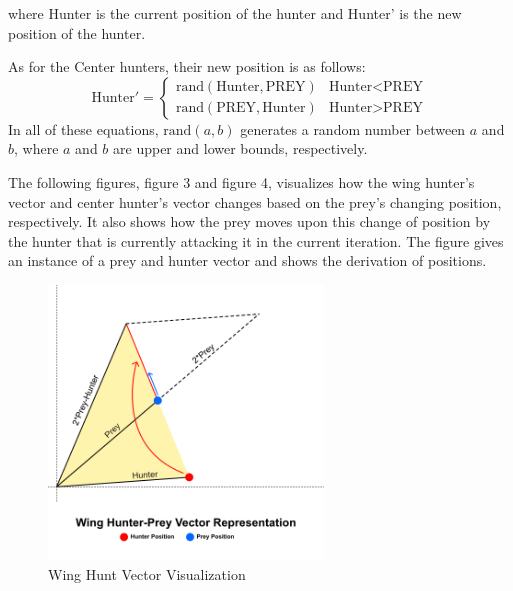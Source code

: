 where Hunter is the current position of the hunter and Hunter' is the new position of the hunter.
\par As for the Center hunters, their new position is as follows:
\[ \text{Hunter}' =  \begin{cases}
      \text{rand}(\text{Hunter}, \text{PREY}) & \text{Hunter} < \text{PREY} \\
      \text{rand}(\text{PREY}, \text{Hunter}) & \text{Hunter} > \text{PREY}
   \end{cases}
\]
In all of these equations, $\text{rand}(a,b)$ generates a random number between $a$ and $b$, where $a$ and $b$ are upper and lower bounds, respectively.

\par The following figures, figure 3 and figure 4, visualizes how the wing hunter's vector and center hunter's vector changes based on the prey's changing position, respectively. It also shows how the prey moves upon this change of position by the hunter that is currently attacking it in the current iteration. The figure gives an instance of a prey and hunter vector and shows the derivation of positions.

\begin{figure}[h]
\begin{center}
\includegraphics[width=0.65\textwidth]{img/pa/wing-hunt}
\caption{Wing Hunt Vector Visualization}
\end{center}
\end{figure}

